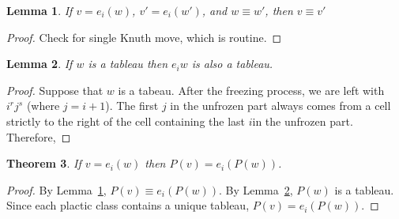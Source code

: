\documentclass[12pt]{amsart}
\newtheorem{theorem}{Theorem}[subsection]
\newtheorem{lemma}[theorem]{Lemma}
\theoremstyle{definition}
\theoremstyle{example}
\begin{document}
\begin{lemma}
  \label{lemma:knuth-plactic}
  If $v=e_i(w)$, $v'=e_i(w')$, and $w\equiv w'$, then $v\equiv v'$
\end{lemma}
\begin{proof}
  Check for single Knuth move, which is routine.
\end{proof}
\begin{lemma}
  \label{lemma:tab2tab}
  If $w$ is a tableau then $e_iw$ is also a tableau.
\end{lemma}
\begin{proof}
  Suppose that $w$ is a tabeau.
  After the freezing process, we are left with $i^rj^s$ (where $j=i+1$).
  The first $j$ in the unfrozen part always comes from a cell strictly to the right of the cell containing the last $i$in the unfrozen part.
  Therefore, 
\end{proof}
\begin{theorem}
  If $v=e_i(w)$ then $P(v)=e_i(P(w))$.
\end{theorem}
\begin{proof}
  By Lemma~\ref{lemma:knuth-plactic}, $P(v)\equiv e_i(P(w))$.
  By Lemma~\ref{lemma:tab2tab}, $P(w)$ is a tableau.
  Since each plactic class contains a unique tableau, $P(v)=e_i(P(w))$.
\end{proof}
\end{document}
